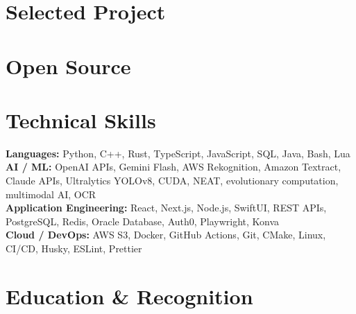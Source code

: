 \documentclass{../../../../Styles/MG-Style}
\begin{document}
\section{Selected Project}

\section{Open Source}

\begin{itemize}
\end{itemize}

\section{Technical Skills}
\small
\textbf{Languages:} Python, C++, Rust, TypeScript, JavaScript, SQL, Java, Bash, Lua \\
\textbf{AI / ML:} OpenAI APIs, Gemini Flash, AWS Rekognition, Amazon Textract, Claude APIs, Ultralytics YOLOv8, CUDA, NEAT, evolutionary computation, multimodal AI, OCR \\
\textbf{Application Engineering:} React, Next.js, Node.js, SwiftUI, REST APIs, PostgreSQL, Redis, Oracle Database, Auth0, Playwright, Konva \\
\textbf{Cloud / DevOps:} AWS S3, Docker, GitHub Actions, Git, CMake, Linux, CI/CD, Husky, ESLint, Prettier

\section{Education \& Recognition}

\begin{itemize}
\end{itemize}
\end{document}
